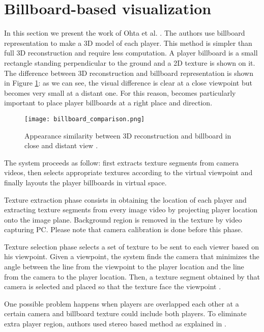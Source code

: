 \section{Billboard-based visualization}
In this section we present the work of Ohta et al. \cite{03_billboard}.
The authors use billboard representation to make a 3D model of each player.
This method is simpler than full 3D reconstruction and require less computation.
A player billboard is a small rectangle standing perpendicular to the ground
and a 2D texture is shown on it.
The difference between 3D reconstruction and billboard representation is shown in Figure \ref{fig:billboard_comparison}:
as we can see, the visual difference is clear at a close viewpoint but becomes very small at a distant one.
For this reason, becomes particularly important to place player billboards at a right place and direction.

\begin{figure}[htbp]
\centerline{\texttt{[image: billboard\_comparison.png]}}
\caption{Appearance similarity between 3D reconstruction and billboard in close and distant view \cite{03_billboard}.}
\label{fig:billboard_comparison}
\end{figure}


The system proceeds as follow: first extracts texture segments from camera videos, then selects appropriate textures according
to the virtual viewpoint and finally layouts the player billboards in virtual space.

Texture extraction phase consists in obtaining the location of each player and extracting texture segments from every image 
video by projecting player location onto the image plane.
Background region is removed in the texture by video capturing PC.
Please note that camera calibration is done before this phase.

Texture selection phase selects a set of texture to be sent to each viewer based on his viewpoint. 
Given a viewpoint, the system finds the camera that minimizes the angle between the line from the viewpoint to the player 
location and the line from the camera to the player location. Then, a texture segment obtained by that camera is selected 
and placed so that the texture face the viewpoint \cite{03_billboard}.


One possible problem happens when players are overlapped each other at a certain camera and billboard texture could include both
players.
To eliminate extra player region, authors used stereo based method \cite{03_billboard_04} as explained in \cite{03_billboard}. 


